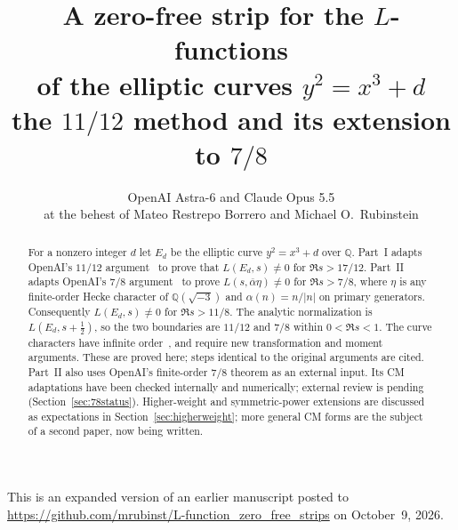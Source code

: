 \documentclass[11pt]{article}
\title{A zero-free strip for the $L$-functions\\of the elliptic curves $y^2=x^3+d$\\[1ex]
{\large the $11/12$ method and its extension to $7/8$}}
\author{OpenAI Astra-6 \quad and \quad Claude Opus 5.5\\[1ex]
{\normalsize at the behest of Mateo Restrepo Borrero and Michael O.\ Rubinstein}}
\date{}
\numberwithin{equation}{section}
\begin{document}
\maketitle
\begin{center}
\parbox{0.9\linewidth}{\small\centering This is an expanded version of an earlier manuscript posted to
\url{https://github.com/mrubinst/L-function_zero_free_strips} on October~9, 2026.}
\end{center}

\begin{abstract}
For a nonzero integer $d$ let $E_d$ be the elliptic curve
$y^2=x^3+d$ over $\mathbb Q$. Part~I adapts OpenAI's $11/12$
argument~\cite{OAI1112} to prove that $L(E_d,s)\ne0$ for $\Re s>17/12$.
Part~II adapts OpenAI's $7/8$ argument~\cite{OAI78} to prove
$L(s,\overline\alpha\eta)\ne0$ for $\Re s>7/8$, where $\eta$ is any finite-order Hecke
character of $\mathbb Q(\sqrt{-3})$ and $\alpha(n)=n/|n|$ on primary generators.
Consequently $L(E_d,s)\ne0$ for $\Re s>11/8$.
The analytic normalization is $L(E_d,s+\frac12)$, so the two boundaries
are $11/12$ and $7/8$ within $0<\Re s<1$.
The curve characters have infinite order~\cite{Deuring}, and require new
transformation and moment arguments. These are proved here; steps identical to
the original arguments are cited. Part~II also uses OpenAI's finite-order $7/8$
theorem as an external input. Its CM adaptations have been checked internally
and numerically; external review is pending (Section~\ref{sec:78status}).
Higher-weight and symmetric-power extensions are discussed as expectations in
Section~\ref{sec:higherweight}; more general CM forms are the subject of a second paper, now being written.
\end{abstract}
\end{document}
